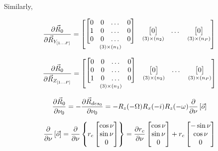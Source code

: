 Similarly,

\begin{equation}
\pdv{\vec{R}_0}{\vec{R}_{Y_{[1 ... P]}}} = 
\begin{bmatrix}
\underset{(3) \times (n_1)}{
\begin{bmatrix}
0 & 0 & \dots & 0 \\
1 & 0 & \dots & 0 \\
0 & 0 & \dots & 0
\end{bmatrix}
} & 
\underset{(3) \times (n_2)}{
\begin{bmatrix}
0
\end{bmatrix}
} &
\dots &
\underset{(3) \times (n_P)}{
\begin{bmatrix}
0
\end{bmatrix}
}
\end{bmatrix}
\end{equation}

\begin{equation}
\pdv{\vec{R}_0}{\vec{R}_{Z_{[1 ... P]}}} = 
\begin{bmatrix}
\underset{(3) \times (n_1)}{
\begin{bmatrix}
0 & 0 & \dots & 0 \\
0 & 0 & \dots & 0 \\
1 & 0 & \dots & 0
\end{bmatrix}
} & 
\underset{(3) \times (n_2)}{
\begin{bmatrix}
0
\end{bmatrix}
} &
\dots &
\underset{(3) \times (n_P)}{
\begin{bmatrix}
0
\end{bmatrix}
}
\end{bmatrix}
\end{equation}

\begin{equation}
\pdv{\vec{R}_0}{\nu_0} = -\pdv{\vec{R}_{des_0}}{\nu_0} = 
- R_z (-\Omega) R_x(-i) R_z(-\omega) \pdv{}{\nu}\left[ \vec{o} \right]
\end{equation}

\begin{equation}
\pdv{}{\nu}\left[ \vec{o} \right] = 
\pdv{}{\nu}\left\{ r_c
\begin{bmatrix}
\cos {\nu} \\ \sin {\nu} \\ 0
\end{bmatrix}  \right\} = 
\pdv{r_c}{\nu}
\begin{bmatrix}
\cos {\nu} \\ \sin {\nu} \\ 0
\end{bmatrix} + 
r_c
\begin{bmatrix}
-\sin {\nu} \\ \cos {\nu} \\ 0
\end{bmatrix} 
\end{equation}

